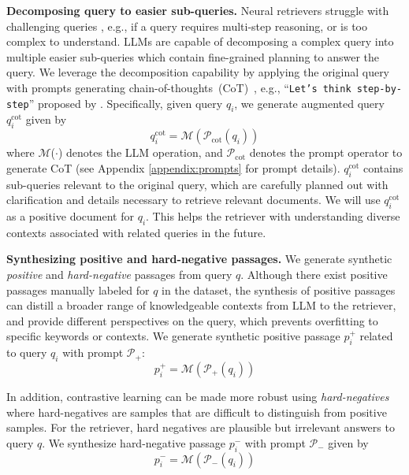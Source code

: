 \noindent\textbf{Decomposing query to easier sub-queries.} Neural retrievers struggle with challenging queries \cite{li2024retrieval}, e.g., if a query requires {multi-step reasoning}, or is {too complex to understand}. LLMs are capable of decomposing a complex query into multiple easier sub-queries which contain fine-grained planning to answer the query. We leverage the decomposition capability by applying the original query with prompts generating chain-of-thoughts~(CoT)~\cite{wei2022chain}, e.g., ``\texttt{Let's think step-by-step}'' proposed by \cite{kojima2022large}. Specifically, given query $q_i$, we generate augmented query $q^\mathrm{cot}_i$ given by
\begin{equation}
    q^\mathrm{cot}_i = \mathcal{M}(\mathcal{P}_\mathrm{cot}(q_i))
\end{equation}
where $\mathcal{M}$($\cdot$) denotes the LLM operation, and $\mathcal{P}_\mathrm{cot}$ denotes the prompt operator to generate CoT (see Appendix \ref{appendix:prompts} for prompt details). $q^\mathrm{cot}_i$ contains sub-queries relevant to the original query, which are carefully planned out with clarification and details necessary to retrieve relevant documents. We will use $q^\mathrm{cot}_i$ as a positive document for $q_i$. This helps the retriever with understanding diverse contexts associated with related queries in the future. 

\noindent\textbf{Synthesizing positive and hard-negative passages.}  
We generate synthetic \emph{positive} and \emph{hard-negative} passages from query $q$.  Although there exist positive passages manually labeled for $q$ in the dataset, the synthesis of positive passages can distill a broader range of knowledgeable contexts from LLM to the retriever, and provide different perspectives on the query, which prevents overfitting to specific keywords or contexts. We generate synthetic positive passage $p_i^+$ related to query $q_i$ with prompt $\mathcal{P}_+$:
\begin{equation}
p^+_i = \mathcal{M}(\mathcal{P}_+(q_i))
\end{equation}

In addition, contrastive learning can be made more robust using \emph{hard-negatives}  \cite{robinson2021contrastive} where hard-negatives are samples that are difficult to distinguish from positive samples. For the retriever, hard negatives are plausible but irrelevant answers to query $q$. We synthesize hard-negative passage $p_i^-$ with prompt $\mathcal{P}_-$ given by
\begin{equation}
p^-_i = \mathcal{M}(\mathcal{P}_-(q_i))
\end{equation}

